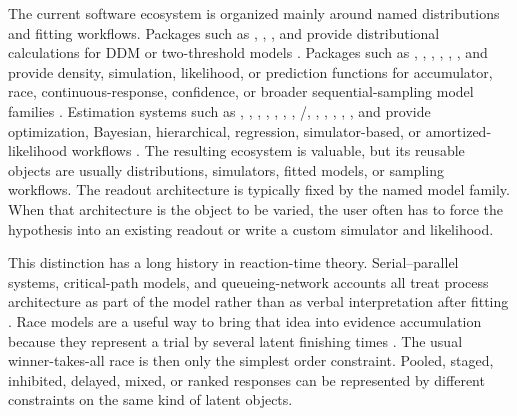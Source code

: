 \documentclass[article]{jss}
\begin{document}
The current software ecosystem is organized mainly around named distributions
and fitting workflows. Packages such as , ,
, and  provide distributional calculations for DDM or
two-threshold models \citep{wabersichRWienerPackage2014,
fosterFddmPackage2024, linDdmodelPackage2025, hartmannReamPackage2025}.
Packages such as , , ,
, , , and
 provide density, simulation, likelihood, or
prediction functions for accumulator, race, continuous-response, confidence, or
broader sequential-sampling model families \citep{singmannRtdistsPackage2026,
linLbaModelPackage2025, linCircularDDMPackage2018,
hellmannDynconfirPackage2025, zhuEamPackage2026,
fenglerLikelihoodApproximation2021, fernandezSequentialSamplingModels2024}.
Estimation systems such as , , ,
, , , ,
/, , , , ,
, and  provide optimization, Bayesian, hierarchical,
regression, simulator-based, or amortized-likelihood workflows
\citep{vossFastdmFree2007, shinnPyDDM2020, murrowPyBEAM2023,
koobDriftdmPackage2026, mackenzieDmcfunPackage2024, molenaarDiffIRT2015,
jinRegddmPackage2025, heathcoteDynamicModels2019, linGgdmcPackage2025,
stevensonEMC2Package2024, cooperPmwgPackage2024, burknerBrmsPackage2017,
popovBmmPackage2026, wieckiHDDM2013, fenglerHssmPackage2026}.
The resulting ecosystem is valuable, but its reusable objects are usually
distributions, simulators, fitted models, or sampling workflows. The readout
architecture is typically fixed by the named model family. When that
architecture is the object to be varied, the user often has to force the
hypothesis into an existing readout or write a custom simulator and likelihood.

This distinction has a long history in reaction-time theory. Serial--parallel
systems, critical-path models, and queueing-network accounts all treat process
architecture as part of the model rather than as verbal interpretation after
fitting \citep{schweickertCriticalPath1978, townsendSerialparallelDilemma2004,
liuQueueingNetwork2007}. Race models are a useful way to bring that idea into
evidence accumulation because they represent a trial by several latent finishing
times \citep{heathcoteWinnerTakes2022}. The usual winner-takes-all race is then
only the simplest order constraint. Pooled, staged, inhibited, delayed, mixed,
or ranked responses can be represented by different constraints on the same
kind of latent objects.
\end{document}
